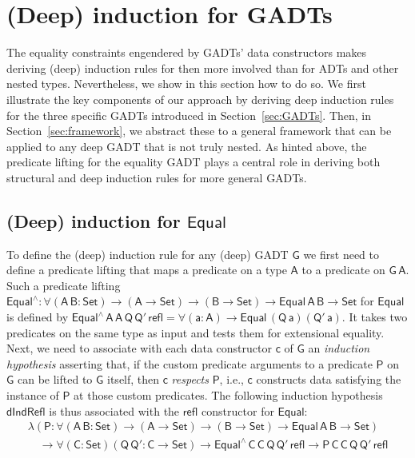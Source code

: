\documentclass[9pt]{entcs}
\begin{document}
\section{(Deep) induction for GADTs}\label{sec:deep-ind-GADTs}

The equality constraints engendered by GADTs' data constructors makes
deriving (deep) induction rules for then more involved than for ADTs
and other nested types. Nevertheless, we show in this section how to
do so. We first illustrate the key components of our approach by
deriving deep induction rules for the three specific GADTs introduced
in Section~\ref{sec:GADTs}. Then, in Section~\ref{sec:framework}, we
abstract these to a general framework that can be applied to any deep
GADT that is not truly nested. As hinted above, the predicate lifting
for the equality GADT plays a central role in deriving both structural
and deep induction rules for more general GADTs.
 
\subsection{(Deep) induction for $\mathsf{Equal}$}\label{sec:ind-equal}

To define the (deep) induction rule for any (deep) GADT $\mathsf{G}$
we first need to define a predicate lifting that maps a predicate on a
type $\mathsf{A}$ to a predicate on $\mathsf{G\,A}$. Such a predicate
lifting $\mathsf{Equal^{\wedge} : \forall (A\,B : Set) \to (A \to Set)
  \to (B \to Set) \to Equal\,A\,B \to Set}$ for $\mathsf{Equal}$ is
defined by $\mathsf{Equal^{\wedge}\,A\,A\,Q\,Q'\,refl = \forall (a :
  A) \to Equal\,(Q\,a)(Q'\,a)}$.  It takes two predicates on the same
type as input and tests them for extensional equality.
%
Next, we need to associate with each data constructor $\mathsf{c}$ of
$\mathsf{G}$ an {\em induction hypothesis} asserting that, if the
custom predicate arguments to a predicate $\mathsf{P}$ on $\mathsf{G}$
can be lifted to $\mathsf{G}$ itself, then $\mathsf{c}$ {\em respects}
$\mathsf{P}$, i.e., $\mathsf{c}$ constructs data satisfying the
instance of $\mathsf{P}$ at those custom predicates. The following
induction hypothesis $\mathsf{dIndRefl}$ is thus associated with the
$\mathsf{refl}$ constructor for $\mathsf{Equal}$:
\begin{equation*}\label{eq:ind-refl}
\begin{array}{l}
\mathsf{\lambda (P : \forall (A\,B : Set) \to (A \to Set) \to (B \to
  Set) \to Equal\,A\,B \to Set)} \\ 
\quad\mathsf{\to \forall (C : Set) (Q\, Q' : C \to Set) \to
  Equal^{\wedge}\,C\,C\,Q\,Q'\,refl \to P\,C\,C\,Q\,Q'\,refl} 
\end{array}
\end{equation*}
\end{document}
